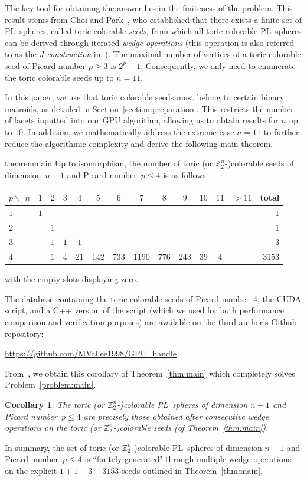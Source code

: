 \documentclass[11pt]{amsart}
\theoremstyle{plain}
\newtheorem{corollary}[theorem]{Corollary}
\numberwithin{equation}{section}
\theoremstyle{definition}
\newcommand{\Z}{\mathbb{Z}}
\begin{document}
The key tool for obtaining the answer lies in the finiteness of the problem.
This result stems from Choi and Park~\cite{CP_wedge_2}, who established that there exists a finite set of PL~spheres, called toric colorable \emph{seeds}, from which all toric colorable PL~spheres can be derived through iterated \emph{wedge operations} (this operation is also referred to as the \emph{$J$-construction} in~\cite{BBCG2010}).
The maximal number of vertices of a toric colorable seed of Picard number $p\geq 3$ is $2^p-1$.
Consequently, we only need to enumerate the toric colorable seeds up to $n=11$.

In this paper, we use that toric colorable seeds must belong to certain binary matroids, as detailed in Section~\ref{section:preparation}.
This restricts the number of facets inputted into our GPU algorithm, allowing us to obtain results for $n$ up to $10$.
In addition, we mathematically address the extreme case $n=11$ to further reduce the algorithmic complexity and derive the following main theorem.
\begin{restatable*}{theorem}{main} \label{thm:main}
	Up to isomorphism, the number of toric (or $\Z_2^n$-)colorable seeds of dimension~$n-1$ and Picard number~$p\leq 4$ is as follows:
	\begin{center}
		\begin{tabular}{l*{12}{c}r}
			\toprule
			$p\backslash\:\: n$ &$1$ & $2$ & $3$ & $4$ & $5$ & $6$ & $7$ & $8$ & $9$ & $10$ & $11$ & $>11$& total \tabularnewline \midrule
			$1$&$1$&  &&&&&&&&&&&$1$\tabularnewline
			$2$ && $1$ & & &&&&&&&&& $1$\tabularnewline
			$3$ && $1$ & $1$& $1$& & & & &&&& &$3$\tabularnewline
			$4$ && $1$ & $4$ & $21$ & $142$ & $733$ & $1190$ & $776$ & $243$& $39$ & $4$ & &$3153$\tabularnewline
			\bottomrule
		\end{tabular}
	\end{center}
	with the empty slots displaying zero.
\end{restatable*}

The database containing the toric colorable seeds of Picard number~$4$, the CUDA script, and a C++ version of the script (which we used for both performance comparison and verification purposes) are available on the third author's Github repository:
\begin{center}
\url{https://github.com/MVallee1998/GPU_handle}
\end{center}

From~\cite{CP_wedge_2}, we obtain this corollary of Theorem~\ref{thm:main} which completely solves Problem~\ref{problem:main}.
\begin{corollary}\label{corollary:main} The toric (or $\Z_2^n$-)colorable PL~spheres of dimension $n-1$ and Picard number~$p\leq 4$ are precisely those obtained after consecutive wedge operations on the toric (or $\Z_2^n$-)colorable seeds (of Theorem~\ref{thm:main}).
\end{corollary}
In summary, the set of toric (or $\Z_2^n$-)colorable PL~spheres of dimension $n-1$ and Picard number~$p\leq 4$ is ``finitely generated" through multiple wedge operations on the explicit  $1+1+3+3153$ seeds outlined in Theorem~\ref{thm:main}.
\end{document}
